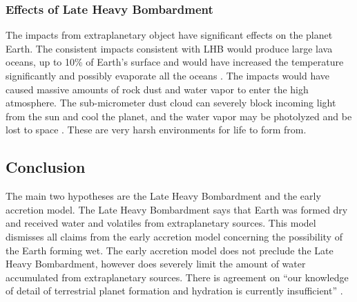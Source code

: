 \subsubsection{Effects of Late Heavy Bombardment}
The impacts from extraplanetary object have significant effects on the planet Earth.
The consistent impacts consistent with LHB would produce large lava oceans, up to 10\% of Earth's surface  and would have increased the temperature significantly and possibly evaporate all the oceans \cite{LavaOcean}.
The impacts would have caused massive amounts of rock dust and water vapor to enter the high atmosphere. The sub-micrometer dust cloud can severely block incoming light from the sun and cool the planet, and the water vapor may be photolyzed and be lost to space \cite{ImpactDust}. 
These are very harsh environments for life to form from.


\subsection{Conclusion}

The main two hypotheses are the Late Heavy Bombardment and the early accretion model. The Late Heavy Bombardment says that Earth was formed dry and received water and volatiles from extraplanetary sources. This model dismisses all claims from the early accretion model concerning the possibility of the Earth forming wet. The early accretion model does not preclude the Late Heavy Bombardment, however does severely limit the amount of water accumulated from extraplanetary sources. There is agreement on “our knowledge of detail of terrestrial planet formation and hydration is currently insufficient” \cite{BOMB14}.




